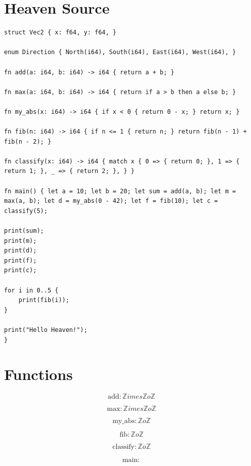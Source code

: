 \documentclass{article}
\begin{document}
\section{Heaven Source}

\begin{lstlisting}
struct Vec2 { x: f64, y: f64, }

enum Direction { North(i64), South(i64), East(i64), West(i64), }

fn add(a: i64, b: i64) -> i64 { return a + b; }

fn max(a: i64, b: i64) -> i64 { return if a > b then a else b; }

fn my_abs(x: i64) -> i64 { if x < 0 { return 0 - x; } return x; }

fn fib(n: i64) -> i64 { if n <= 1 { return n; } return fib(n - 1) + fib(n - 2); }

fn classify(x: i64) -> i64 { match x { 0 => { return 0; }, 1 => { return 1; }, _ => { return 2; }, } }

fn main() { let a = 10; let b = 20; let sum = add(a, b); let m = max(a, b); let d = my_abs(0 - 42); let f = fib(10); let c = classify(5);

print(sum);
print(m);
print(d);
print(f);
print(c);

for i in 0..5 {
    print(fib(i));
}

print("Hello Heaven!");
}

\end{lstlisting}

\section{Functions}

\begin{equation}
\text{add} : \mathbb{Z} 	imes \mathbb{Z} 	o \mathbb{Z}
\end{equation}

\begin{equation}
\text{max} : \mathbb{Z} 	imes \mathbb{Z} 	o \mathbb{Z}
\end{equation}

\begin{equation}
\text{my_abs} : \mathbb{Z} 	o \mathbb{Z}
\end{equation}

\begin{equation}
\text{fib} : \mathbb{Z} 	o \mathbb{Z}
\end{equation}

\begin{equation}
\text{classify} : \mathbb{Z} 	o \mathbb{Z}
\end{equation}

\begin{equation}
\text{main} : 
\end{equation}
\end{document}
